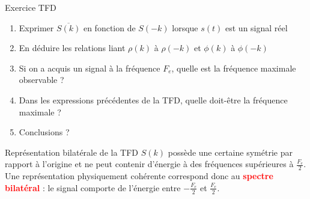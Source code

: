 \documentclass{beamer}
\begin{document}
\begin{frame}
\begin{exampleblock}{Exercice TFD}
\begin{enumerate}\justifying
	\item Exprimer $\overline{S(k)}$ en fonction de $S(-k)$ lorsque $s(t)$ est un
	signal réel
	\item En déduire les relations liant $\rho(k)$ à $\rho(-k)$ et $\phi(k)$ à
	$\phi(-k)$
	\item Si on a acquis un signal à la fréquence $F_e$, quelle est la fréquence
	maximale observable ?
	\item Dans les expressions précédentes de la TFD, quelle doit-être la
	fréquence maximale ?
	\item Conclusions ?
\end{enumerate}
\end{exampleblock}
\pause
\begin{alertblock}{Représentation bilatérale de la TFD}
\justifying
$S(k)$ possède une certaine symétrie par rapport à l'origine et ne peut contenir
d'énergie à des fréquences supérieures à $\frac{F_e}{2}$. Une 
représentation physiquement cohérente correspond donc
au \textcolor{red}{\textbf{spectre bilatéral}} : le signal comporte de
l'énergie entre $-\frac{F_e}{2}$ et $\frac{F_e}{2}$.
\end{alertblock}
\end{frame}
\end{document}
